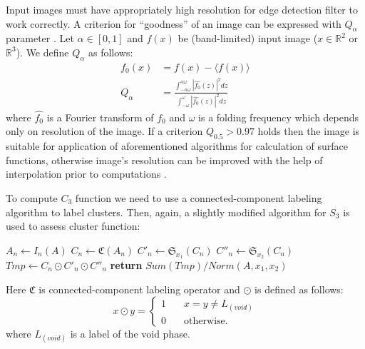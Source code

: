 \documentclass[reprint,amsmath,amssymb,aps,pre,showkeys,showpacs]{revtex4-1}
\begin{document}
Input images must have appropriately high resolution for edge detection filter
to work correctly. A criterion for ``goodness'' of an image can be expressed
with $Q_\alpha$ parameter \cite{samarin2023robust}. Let $\alpha \in [0, 1]$
and $f(x)$ be (band-limited) input image ($x \in \mathbb{R}^2$ or
$\mathbb{R}^3$). We define $Q_\alpha$ as follows:
\begin{equation}
  \begin{aligned}
    f_0(x) &= f(x) - \langle f(x) \rangle \\
    Q_\alpha &= \frac{\int_{-\alpha\omega}^{\alpha\omega} |\hat{f_0}(z)|^2
      dz}{\int_{-\omega}^{\omega} |\hat{f_0}(z)|^2 dz}
  \end{aligned}
\end{equation}
where $\hat{f_0}$ is a Fourier transform of $f_0$ and $\omega$ is a folding
frequency which depends only on resolution of the image. If a criterion
$Q_{0.5} > 0.97$ holds then the image is suitable for application of
aforementioned algorithms for calculation of surface functions, otherwise
image's resolution can be improved with the help of interpolation prior to
computations \cite{samarin2023robust}.

To compute $C_3$ function we need to use a connected-component labeling
algorithm \cite{4728561,PhysRevB.14.3438} to label clusters. Then, again, a
slightly modified algorithm for $S_3$ is used to assess cluster function:
\begin{algorithmic}[1]
  \State $A_n \gets I_n (A)$
  \State $C_n \gets \mathfrak{C}(A_n)$
  \State $C'_n \gets \mathfrak{S}_{x_1}(C_n)$
  \State $C''_n \gets \mathfrak{S}_{x_2}(C_n)$
  \State $Tmp \gets C_n \odot C'_n \odot C''_n$
  \State \textbf{return} $Sum(Tmp) / Norm(A, x_1, x_2)$
  \EndProcedure
\end{algorithmic}
Here $\mathfrak{C}$ is connected-component labeling operator and $\odot$ is
defined as follows:
\begin{equation}
  x \odot y = \left\{
  \begin{array}{ll}
    1 & \quad x = y \ne L_{(void)} \\
    0 & \quad \text{otherwise}.
  \end{array}
  \right.
\end{equation}
where $L_{(void)}$ is a label of the void phase.
\end{document}
